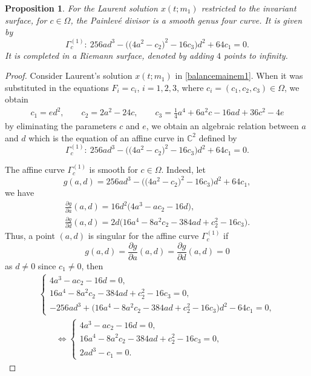 \documentclass[pdftex]{sigma}
\numberwithin{equation}{section}
\newtheorem{Proposition}[Theorem]{Proposition}
 { \theoremstyle{definition}
\newtheorem{Definition}[Theorem]{Definition}
\newtheorem{Note}[Theorem]{Note}
\newtheorem{Example}[Theorem]{Example}
\newtheorem{Remark}[Theorem]{Remark} }
\begin{document}
\begin{Proposition}\label{proposition3.5}
For the Laurent solution $x(t;m_1)$ restricted to the
invariant surface, for $c \in \Omega$, the Painlev\'e divisor
 is a smooth genus four curve. It is
given by
\begin{equation*}
 \Gamma_c^{(1)}\colon \ 256ad^3-\bigl(\bigl(4a^2-c_2\bigr)^2-16c_3\bigr)d^2+64c_1=0.
\end{equation*}
It is completed in a Riemann surface, denoted
 by adding $4$ points to
infinity.
\end{Proposition}

\begin{proof}
Consider Laurent's solution $x(t;m_1)$ in \eqref{balancemainem1}. When it was substituted in the
equations $F_i=c_i$, $i=1,2,3$, where
$c_i=(c_1,c_2,c_3)\in \Omega$, we
obtain
\begin{gather*}
 c_1 = ed^2, \qquad
 c_2 = 2a^2-24c, \qquad
 c_3 = \frac{1}{4}a^4+6a^2c-16ad+36c^2-4e
\end{gather*}
by eliminating the parameters $c$ and $e$, we obtain an algebraic
relation between $a$ and $d$ which is the equation of an affine
curve in $\mathbb{C}^2$ defined by
\begin{equation*}
 \Gamma_c^{(1)}\colon \ 256ad^3-\bigl(\bigl(4a^2-c_2\bigr)^2-16c_3\bigr)d^2+64c_1=0.
\end{equation*}

The affine curve $ \Gamma_c^{(1)}$ is smooth for $c\in
\Omega$. Indeed, let
\[g(a,d)=256ad^3-\bigl(\bigl(4a^2-c_2\bigr)^2-16c_3\bigr)d^2+64c_1, \]
we have
\begin{gather*}
 \frac{\partial g}{\partial a}(a,d) = 16d^2\bigl(4a^3-ac_2-16d\bigr),\\
 \frac{\partial g}{\partial d}(a,d) = 2d\bigl(16a^4-8a^2c_2-384ad+c_2^2-16c_3\bigr).
\end{gather*}
Thus, a point $(a,d)$ is singular for the affine curve $
\Gamma_c^{(1)}$ if \[g(a,d)= \frac{\partial
g}{\partial a}(a,d)= \frac{\partial g}{\partial
d}(a,d)=0\] as $d\neq 0$ since $c_1
\neq 0$, then
\begin{gather*}
 \begin{cases}
 4a^3-ac_2-16d=0, \\
 16a^4-8a^2c_2-384ad+c_2^2-16c_3=0 ,\\
 -256ad^3+\bigl(16a^4-8a^2c_2-384ad+c_2^2-16c_3\bigr)d^2-64c_1=0,
 \end{cases} \\
\qquad{}\Leftrightarrow
 \begin{cases}
 4a^3-ac_2-16d=0, \\
 16a^4-8a^2c_2-384ad+c_2^2-16c_3=0 ,\\
 2ad^3-c_1=0.
 \end{cases}
\end{gather*}


\end{proof}
\end{document}
